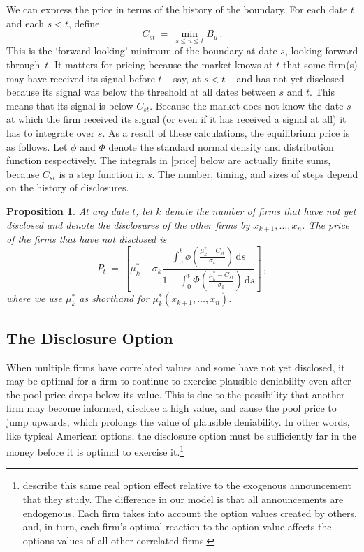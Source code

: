 \documentclass[ecta,nameyear,draft]{econsocart}
\theoremstyle{theorem}
\newtheorem{proposition}{Proposition}
\numberwithin{lemma}{section}
\numberwithin{proposition}{section}
\numberwithin{equation}{section}
\numberwithin{figure}{section}
\newcommand{\D}{\mathrm{d}}
\begin{document}
We can express the price in terms of the history of the boundary.  For each date $t$ and each $s<t$, define
$$C_{st} \ = \  \min_{s\le u \le t} B_u\,.$$
This is the `forward looking' minimum of the boundary at date $s$, looking forward through~$t$.  It matters for pricing because the market knows at $t$ that some firm(s) may have received its signal before $t$ -- say, at $s<t$ -- and has not yet disclosed because its signal was below the threshold at all dates between $s$ and $t$.  This means that its signal is below $C_{st}$.  Because the market does not know the date $s$ at which the firm received its signal (or even if it has received a signal at all) it has to integrate over $s$.  As a result of these calculations, the equilibrium price is as follows.  Let $\phi$ and $\Phi$ denote the standard normal density and distribution function respectively.  The integrals in \eqref{price} below are actually finite sums, because $C_{st}$ is a step function in $s$.  The number, timing, and sizes of steps depend on the history of disclosures.  

\begin{proposition}\label{prop:price}
At any date $t$, let $k$ denote the number of firms that have not yet disclosed and denote the disclosures of the other firms by $x_{k+1},\ldots, x_n$.  
The price of the firms that have not disclosed is
\begin{equation}\label{price}
P_t \ = \  \left[\mu^*_k - \sigma_k\frac{\int_0^t \phi\left(\frac{\mu^*_k-C_{st}}{\sigma_k}\right)\,\D s}{1 - \int_0^t \Phi\left(\frac{\mu^*_k-C_{st}}{\sigma_k}\right)\,\D s}\right]\,,
\end{equation}
where we use $\mu^*_k$ as shorthand for $\mu^*_k(x_{k+1},\ldots, x_n)$.  
\end{proposition} 

\subsection{The Disclosure Option}\label{ss:option}

When multiple firms have correlated values and some have not yet disclosed, it may be optimal for a firm to continue to exercise plausible deniability even after the pool price drops below its value. This is due to the possibility that another firm may become informed, disclose a high value, and cause the pool price to jump upwards, which prolongs the value of plausible deniability.  In other words, like typical American options, the disclosure option must be sufficiently far in the money before it is optimal to exercise it.\footnote{\citet*{adk} describe this same real option effect relative to the exogenous announcement that they study.  The difference in our model is that all announcements are endogenous.  Each firm takes into account the option values created by others, and, in turn, each firm's optimal reaction to the option value affects the options values of all other correlated firms.}
\end{document}
